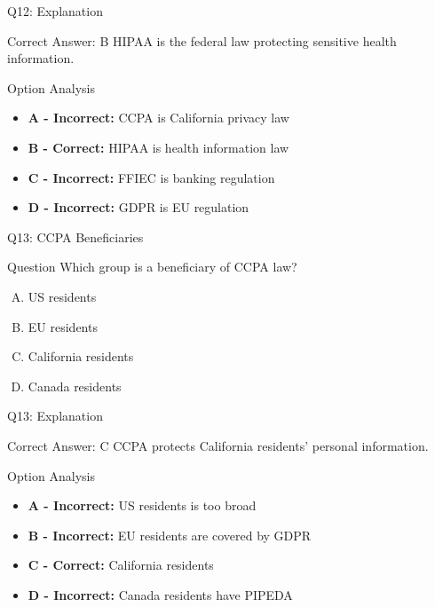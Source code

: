 \documentclass{beamer}
\begin{document}
	\begin{frame}{Q12: Explanation}
		\begin{block}{Correct Answer: B}
			HIPAA is the federal law protecting sensitive health information.
		\end{block}
		\begin{block}{Option Analysis}
			\begin{itemize}
				\item \textbf{A - Incorrect:} CCPA is California privacy law
				\item \textbf{B - Correct:} HIPAA is health information law
				\item \textbf{C - Incorrect:} FFIEC is banking regulation
				\item \textbf{D - Incorrect:} GDPR is EU regulation
			\end{itemize}
		\end{block}
	\end{frame}
	
	\begin{frame}{Q13: CCPA Beneficiaries}
		\begin{block}{Question}
			Which group is a beneficiary of CCPA law?
		\end{block}
		\begin{enumerate}[(A)]
			\item US residents
			\item EU residents
			\item California residents
			\item Canada residents
		\end{enumerate}
	\end{frame}
	
	\begin{frame}{Q13: Explanation}
		\begin{block}{Correct Answer: C}
			CCPA protects California residents' personal information.
		\end{block}
		\begin{block}{Option Analysis}
			\begin{itemize}
				\item \textbf{A - Incorrect:} US residents is too broad
				\item \textbf{B - Incorrect:} EU residents are covered by GDPR
				\item \textbf{C - Correct:} California residents
				\item \textbf{D - Incorrect:} Canada residents have PIPEDA
			\end{itemize}
		\end{block}
	\end{frame}
	
\end{document}
